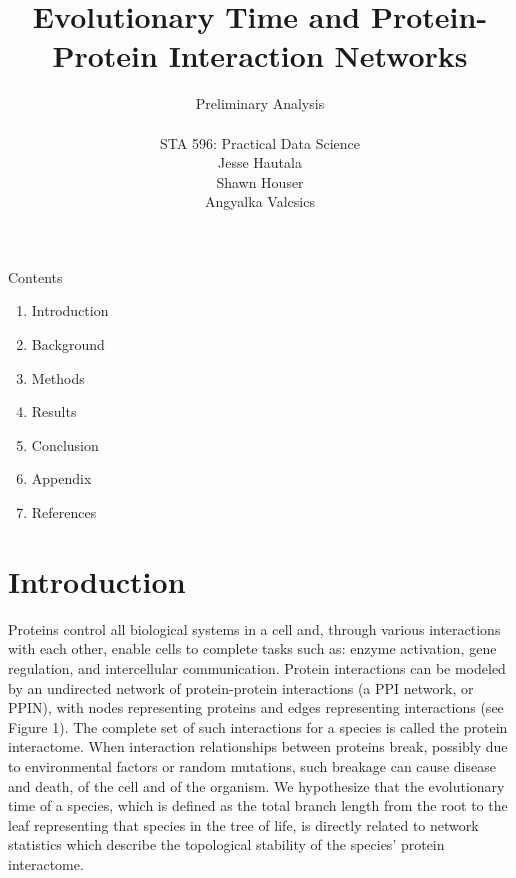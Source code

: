 \documentclass[12pt]{article}
\begin{document}
\title{\textbf{Evolutionary Time and Protein-Protein Interaction Networks}}
\author{Preliminary Analysis \\ \\ STA 596: Practical Data Science \\ Jesse Hautala \\ Shawn Houser \\ Angyalka Valcsics }

	\maketitle
\onehalfspacing

\noindent Contents
\begin{enumerate}[label = \Roman{*}.]
\item Introduction
\item Background
\item Methods
\item Results
\item Conclusion
\item Appendix
\item References \newline
\end{enumerate}

\section{Introduction}
Proteins control all biological systems in a cell and, through various interactions with each other, enable cells to complete tasks such as: enzyme activation, gene regulation, and intercellular communication. Protein interactions can be modeled by an undirected network of protein-protein interactions (a PPI network, or PPIN), with nodes representing proteins and edges representing interactions (see Figure 1). The complete set of such interactions for a species is called the protein interactome. When interaction relationships between proteins break, possibly due to environmental factors or random mutations, such breakage can cause disease and death, of the cell and of the organism. We hypothesize that the evolutionary time of a species, which is defined as the total branch length from the root to the leaf representing that species in the tree of life, is directly related to network statistics which describe the topological stability of the species’ protein interactome.
\end{document}
